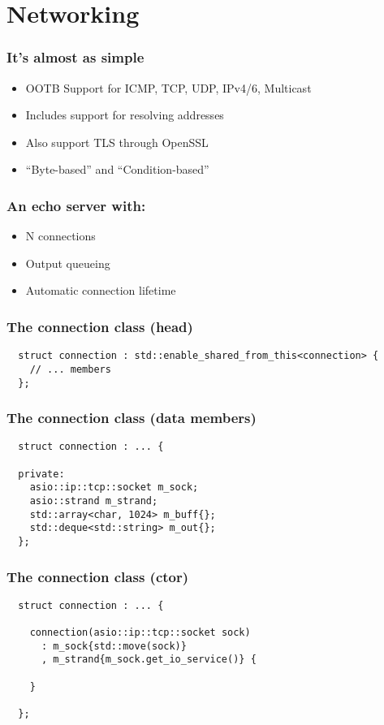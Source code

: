 \section{Networking}

\begin{frame}
  \frametitle{It's almost as simple}
  \begin{itemize}
    \item{OOTB Support for ICMP, TCP, UDP, IPv4/6, Multicast}\pause{}
    \item{Includes support for resolving addresses}\pause{}
    \item{Also support TLS through OpenSSL}\pause{}
    \item{``Byte-based'' and ``Condition-based''}
  \end{itemize}
\end{frame}

\begin{frame}
  \frametitle{An echo server with:}
  \begin{itemize}
    \item{N connections}\pause{}
    \item{Output queueing}\pause{}
    \item{Automatic connection lifetime}
  \end{itemize}
\end{frame}

\begin{frame}[fragile]
  \frametitle{The connection class (head)}
  \begin{verbatim}
  struct connection : std::enable_shared_from_this<connection> {
    // ... members
  };
  \end{verbatim}
\end{frame}

\begin{frame}[fragile]
  \frametitle{The connection class (data members)}
  \begin{verbatim}
  struct connection : ... {

  private:
    asio::ip::tcp::socket m_sock;
    asio::strand m_strand;
    std::array<char, 1024> m_buff{};
    std::deque<std::string> m_out{};
  };
  \end{verbatim}
\end{frame}

\begin{frame}[fragile]
  \frametitle{The connection class (ctor)}
  \begin{verbatim}
  struct connection : ... {

    connection(asio::ip::tcp::socket sock)
      : m_sock{std::move(sock)}
      , m_strand{m_sock.get_io_service()} {

    }

  };
  \end{verbatim}
\end{frame}

